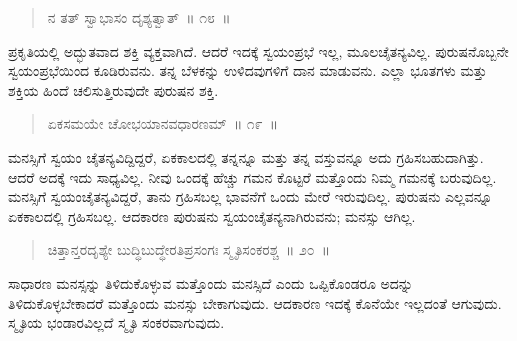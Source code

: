 \vspace{-0.3cm}

\begin{verse}
ನ ತತ್​ ಸ್ವಾಭಾಸಂ ದೃಶ್ಯತ್ವಾತ್​~॥ ೧೮~॥
\end{verse}

\vspace{-0.3cm}


\vskip 0.2cm

ಪ್ರಕೃತಿಯಲ್ಲಿ ಅದ್ಭುತವಾದ ಶಕ್ತಿ ವ್ಯಕ್ತವಾಗಿದೆ. ಆದರೆ ಇದಕ್ಕೆ ಸ್ವಯಂಪ್ರಭೆ ಇಲ್ಲ, ಮೂಲಚೈತನ್ಯವಿಲ್ಲ. ಪುರುಷನೊಬ್ಬನೇ ಸ್ವಯಂಪ್ರಭೆಯಿಂದ ಕೂಡಿರುವನು. ತನ್ನ ಬೆಳಕನ್ನು ಉಳಿದವುಗಳಿಗೆ ದಾನ ಮಾಡುವನು. ಎಲ್ಲಾ ಭೂತಗಳು ಮತ್ತು ಶಕ್ತಿಯ ಹಿಂದೆ ಚಲಿಸುತ್ತಿರುವುದೇ ಪುರುಷನ ಶಕ್ತಿ. 

\vspace{-0.3cm}

\begin{verse}
ಏಕಸಮಯೇ ಚೋಭಯಾನವಧಾರಣಮ್​~॥ ೧೯~॥
\end{verse}

\vspace{-0.3cm}


\vskip 0.2cm

ಮನಸ್ಸಿಗೆ ಸ್ವಯಂ ಚೈತನ್ಯವಿದ್ದಿದ್ದರೆ, ಏಕಕಾಲದಲ್ಲಿ ತನ್ನನ್ನೂ ಮತ್ತು ತನ್ನ ವಸ್ತುವನ್ನೂ ಅದು ಗ್ರಹಿಸಬಹುದಾಗಿತ್ತು. ಆದರೆ ಅದಕ್ಕೆ ಇದು ಸಾಧ್ಯವಿಲ್ಲ. ನೀವು ಒಂದಕ್ಕೆ ಹೆಚ್ಚು ಗಮನ ಕೊಟ್ಟರೆ ಮತ್ತೊಂದು ನಿಮ್ಮ ಗಮನಕ್ಕೆ ಬರುವುದಿಲ್ಲ. ಮನಸ್ಸಿಗೆ ಸ್ವಯಂಚೈತನ್ಯವಿದ್ದರೆ, ತಾನು ಗ್ರಹಿಸಬಲ್ಲ ಭಾವನೆಗೆ ಒಂದು ಮೇರೆ ಇರುವುದಿಲ್ಲ. ಪುರುಷನು ಎಲ್ಲವನ್ನೂ ಏಕಕಾಲದಲ್ಲಿ ಗ್ರಹಿಸಬಲ್ಲ. ಆದಕಾರಣ ಪುರುಷನು ಸ್ವಯಂಚೈತನ್ಯನಾಗಿರುವನು; ಮನಸ್ಸು ಆಗಿಲ್ಲ. 

\vspace{-0.3cm}

\begin{verse}
ಚಿತ್ತಾನ್ತರದೃಶ್ಯೇ ಬುದ್ಧಿಬುದ್ಧೇರತಿಪ್ರಸಂಗಃ ಸ್ಮೃತಿಸಂಕರಶ್ಚ~॥ ೨೦~॥
\end{verse}

\vspace{-0.3cm}


\vskip 0.2cm

ಸಾಧಾರಣ ಮನಸ್ಸನ್ನು ತಿಳಿದುಕೊಳ್ಳುವ ಮತ್ತೊಂದು ಮನಸ್ಸಿದೆ ಎಂದು ಒಪ್ಪಿಕೊಂಡರೂ ಅದನ್ನು ತಿಳಿದುಕೊಳ್ಳಬೇಕಾದರೆ ಮತ್ತೊಂದು ಮನಸ್ಸು ಬೇಕಾಗುವುದು. ಆದಕಾರಣ ಇದಕ್ಕೆ ಕೊನೆಯೇ ಇಲ್ಲದಂತೆ ಆಗುವುದು. ಸ್ಮೃತಿಯ ಭಂಡಾರವಿಲ್ಲದೆ ಸ್ಮೃತಿ ಸಂಕರವಾಗುವುದು. 

